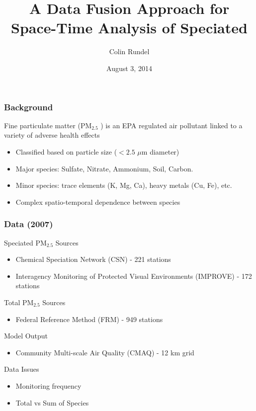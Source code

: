 \documentclass[t]{beamer}\usepackage[]{graphicx}\usepackage[]{color}
\title[Speciated \PM]{A Data Fusion Approach for Space-Time Analysis of Speciated \PM}
\author{Colin Rundel}
\date{August 3, 2014}
\institute[Duke]{Duke University}
\newcommand{\PM}{$\text{PM}_{2.5}$ }
\begin{document}
\begin{frame}[plain]
\titlepage
\end{frame}




\begin{frame}
\frametitle{Background}
    
Fine particulate matter (\PM{}) is an EPA regulated air pollutant linked to a variety of adverse health effects

\begin{itemize}
  \vspace{2mm} \item Classified based on particle size ($<2.5$ $\mu$m diameter)
  \vspace{2mm} \item Major species: Sulfate, Nitrate, Ammonium, Soil, Carbon.
  \vspace{2mm} \item Minor species: trace elements (K, Mg, Ca), heavy metals (Cu, Fe), etc.
  \vspace{2mm} \item Complex spatio-temporal dependence between species
\end{itemize}


\end{frame}


\begin{frame}
\frametitle{Data (2007)}

Speciated \PM Sources
\begin{itemize}
  \item Chemical Speciation Network (CSN) - 221 stations
  \item Interagency Monitoring of Protected Visual Environments (IMPROVE) - 172 stations
\end{itemize}

\vspace{2mm}

Total \PM Sources
\begin{itemize}
  \item Federal Reference Method (FRM) - 949 stations
\end{itemize}

\vspace{2mm}

Model Output
\begin{itemize}
  \item Community Multi-scale Air Quality (CMAQ) - 12 km grid
\end{itemize}

\vspace{5mm}

Data Issues
\begin{itemize}
  \item Monitoring frequency
  \item Total vs Sum of Species
\end{itemize}

\end{frame}
\end{document}
